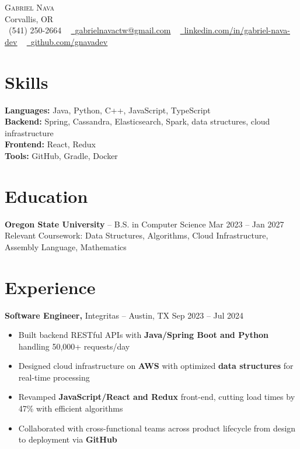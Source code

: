 \documentclass[11pt]{article}
\begin{document}
\begin{center}
    {\Huge \scshape Gabriel Nava} \\ \vspace{1pt}
    Corvallis, OR \\ \vspace{1pt}
    \small \raisebox{-0.1\height}\faPhone\ (541) 250-2664 ~ 
    \href{mailto:gabrielnavactw@gmail.com}{\raisebox{-0.2\height}\faEnvelope\ \underline{gabrielnavactw@gmail.com}} ~ 
    \href{https://linkedin.com/in/gabriel-nava-8bb091208/}{\raisebox{-0.2\height}\faLinkedin\ \underline{linkedin.com/in/gabriel-nava-dev}}  ~
    \href{https://github.com/gnavadev}{\raisebox{-0.2\height}\faGithub\ \underline{github.com/gnavadev}}
    \vspace{-8pt}
\end{center}

\vspace{-12pt}

\section*{Skills}
\textbf{Languages:} Java, Python, C++, JavaScript, TypeScript\\
\textbf{Backend:} Spring, Cassandra, Elasticsearch, Spark, data structures, cloud infrastructure\\
\textbf{Frontend:} React, Redux\\
\textbf{Tools:} GitHub, Gradle, Docker

\vspace{-15pt}

\section*{Education}
\textbf{Oregon State University} -- B.S. in Computer Science \hfill Mar 2023 -- Jan 2027 \\
Relevant Coursework: Data Structures, Algorithms, Cloud Infrastructure, Assembly Language, Mathematics

\vspace{-15pt}

\section*{Experience}
\textbf{Software Engineer,} {Integritas} -- Austin, TX \hfill Sep 2023 -- Jul 2024 \\
\vspace{-9pt}
\begin{itemize}
  \item Built backend RESTful APIs with \textbf{Java/Spring Boot and Python} handling 50,000+ requests/day
  \item Designed cloud infrastructure on \textbf{AWS} with optimized \textbf{data structures} for real-time processing
  \item Revamped \textbf{JavaScript/React and Redux} front-end, cutting load times by 47\% with efficient algorithms
  \item Collaborated with cross-functional teams across product lifecycle from design to deployment via \textbf{GitHub}
\end{itemize}
\end{document}
